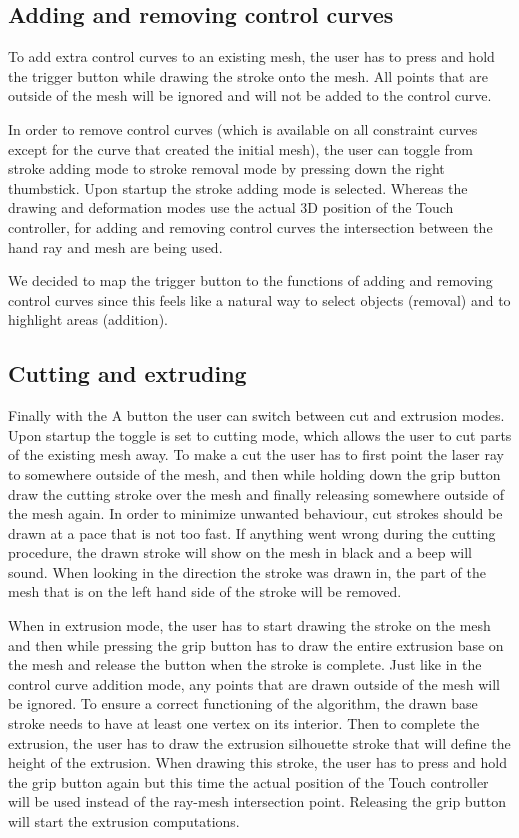 \subsection{Adding and removing control curves}
To add extra control curves to an existing mesh, the user has to press and hold the trigger button while drawing the stroke onto the mesh. All points that are outside of the mesh will be ignored and will not be added to the control curve. 

In order to remove control curves (which is available on all constraint curves except for the curve that created the initial mesh), the user can toggle from stroke adding mode to stroke removal mode by pressing down the right thumbstick. Upon startup the stroke adding mode is selected. Whereas the drawing and deformation modes use the actual 3D position of the Touch controller, for adding and removing control curves the intersection between the hand ray and mesh are being used. 

We decided to map the trigger button to the functions of adding and removing control curves since this feels like a natural way to select objects (removal) and to highlight areas (addition).

\subsection{Cutting and extruding}
Finally with the A button the user can switch between cut and extrusion modes. Upon startup the toggle is set to cutting mode, which allows the user to cut parts of the existing mesh away. To make a cut the user has to first point the laser ray to somewhere outside of the mesh, and then while holding down the grip button draw the cutting stroke over the mesh and finally releasing somewhere outside of the mesh again. In order to minimize unwanted behaviour, cut strokes should be drawn at a pace that is not too fast. If anything went wrong during the cutting procedure, the drawn stroke will show on the mesh in black and a beep will sound. When looking in the direction the stroke was drawn in, the part of the mesh that is on the left hand side of the stroke will be removed.

When in extrusion mode, the user has to start drawing the stroke on the mesh and then while pressing the grip button has to draw the entire extrusion base on the mesh and release the button when the stroke is complete. Just like in the control curve addition mode, any points that are drawn outside of the mesh will be ignored. To ensure a correct functioning of the algorithm, the drawn base stroke needs to have at least one vertex on its interior. Then to complete the extrusion, the user has to draw the extrusion silhouette stroke that will define the height of the extrusion. When drawing this stroke, the user has to press and hold the grip button again but this time the actual position of the Touch controller will be used instead of the ray-mesh intersection point. Releasing the grip button will start the extrusion computations.

